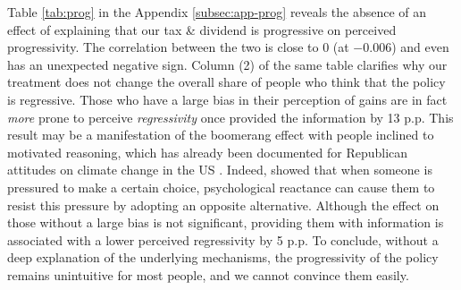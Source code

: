\documentclass[12pt]{article} %
\begin{document}
Table \ref{tab:prog} in the Appendix \ref{subsec:app-prog} reveals the absence of an effect of explaining that our tax \& dividend is progressive on perceived progressivity. The correlation between the two is close to 0 (at $-0.006$) and even has an unexpected negative sign. Column (2) of the same table clarifies why our treatment does not change the overall share of people who think that the policy is regressive. Those who have a large bias in their perception of gains are in fact \textit{more} prone to perceive \textit{regressivity} once provided the information by 13 p.p. This result may be a manifestation of the boomerang effect with people inclined to motivated reasoning, which has already been documented for Republican attitudes on climate change in the US \citep{zhou_boomerangs_2016}. Indeed, \citet{hovland_communication_1953} showed that when someone is pressured to make a certain choice, psychological reactance \citep[theorized by][]{brehm_theory_1966} can cause them to resist this pressure by adopting an opposite alternative. Although the effect on those without a large bias is not significant, providing them with information is associated with a lower perceived regressivity by 5 p.p. To conclude, without a deep explanation of the underlying mechanisms, the progressivity of the policy remains unintuitive for most people, and we cannot convince them easily.


\end{document}
